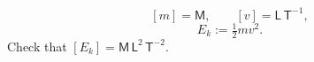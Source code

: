 \[
  [m] = \mathsf{M}, \qquad [v] = \mathsf{L}\,\mathsf{T}^{-1},
\]
\[
  E_{k} := \tfrac{1}{2} m v^{2}.
\]
Check that $[E_{k}] = \mathsf{M}\,\mathsf{L}^{2}\,\mathsf{T}^{-2}$.
